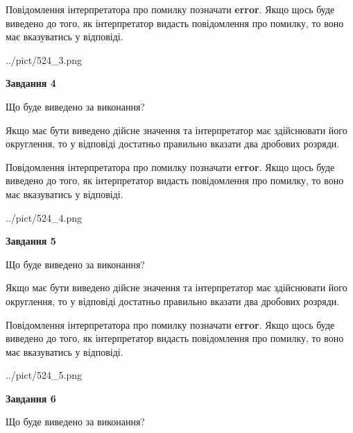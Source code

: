 \documentclass[12pt, ukrainian]{article}
\begin{document}
{\begin {Large}
Повідомлення інтерпретатора про помилку позначати \textbf{error}.
Якщо щось буде виведено до того, як інтерпретатор видасть повідомлення про помилку, 
то воно має вказуватись у відповіді. \par

\begin{center}
	{../pict/524_3.png}
\end{center}
\newpage

{\begin {center}\textbf{Завдання 4}\end {center}}\par
Що буде виведено за виконання? \par

Якщо має бути виведено дійсне значення та інтерпретатор має здійснювати його округлення, 
то у відповіді достатньо правильно вказати два дробових розряди.

Повідомлення інтерпретатора про помилку позначати \textbf{error}.
Якщо щось буде виведено до того, як інтерпретатор видасть повідомлення про помилку, 
то воно має вказуватись у відповіді. \par

\begin{center}
	{../pict/524_4.png}
\end{center}
\newpage

{\begin {center}\textbf{Завдання 5}\end {center}}\par
Що буде виведено за виконання? \par

Якщо має бути виведено дійсне значення та інтерпретатор має здійснювати його округлення, 
то у відповіді достатньо правильно вказати два дробових розряди.

Повідомлення інтерпретатора про помилку позначати \textbf{error}.
Якщо щось буде виведено до того, як інтерпретатор видасть повідомлення про помилку, 
то воно має вказуватись у відповіді. \par

\begin{center}
	{../pict/524_5.png}
\end{center}
\newpage

{\begin {center}\textbf{Завдання 6}\end {center}}\par
Що буде виведено за виконання? \par


\end{Large}}
\end{document}
